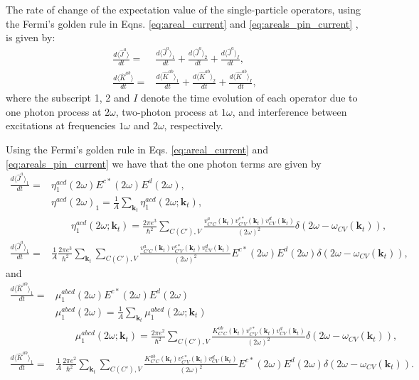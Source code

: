 \documentclass{article}
\begin{document}
The rate of change of the expectation value of the single-particle operators,
using the Fermi's golden rule in Eqns. \eqref{eq:areal_current} and \eqref{eq:areals_pin_current} , is given by:
\begin{align*}
    \frac{d\langle \hat{J}^{a}\rangle}{dt} = & \frac{d\langle \hat{J}^{a}\rangle_{1}}{dt} + 
    \frac{d\langle \hat{J}^{a}\rangle_{2}}{dt} + \frac{d\langle \hat{J}^{a}\rangle_{I}}{dt}, \\
    \frac{d\langle \hat{K}^{ab}\rangle}{dt} = & \frac{d\langle \hat{K}^{ab}\rangle_{1}}{dt} + 
    \frac{d\langle \hat{K}^{ab}\rangle_{2}}{dt} + \frac{d\langle \hat{K}^{ab}\rangle_{I}}{dt},
\end{align*}
where the subscript 1, 2 and $I$ denote the time evolution of each operator due to one photon process at $2\omega$, two-photon process at $1\omega$, and interference between excitations at frequencies $1\omega$ and $2\omega$, respectively.


Using the Fermi's golden rule in Eqs. \ref{eq:areal_current} and \ref{eq:areals_pin_current} we have that the one photon terms are given by
\begin{align*}
    \frac{d \langle \hat{J}^{a} \rangle_{1}}{dt} = & \eta_{1}^{acd}(2\omega) E^{c*}(2\omega) E^{d}(2\omega), \\
    & \eta^{acd}(2\omega)_{1} = \frac{1}{A} \sum_{\mathbf{k}_{t}} \eta_{1}^{acd}(2\omega;\mathbf{k}_{t}), \\
    & \qquad \eta_{1}^{acd}(2\omega;\mathbf{k}_{t}) = \frac{2\pi e^{3}}{\hbar^{2}} \sum_{C(C'),V}
    \frac{v^{a}_{C'C}(\mathbf{k}_{t})v^{c*}_{C'V}(\mathbf{k}_{t})v^{d}_{CV}(\mathbf{k}_{t})}{(2\omega)^{2}}
    \delta(2\omega-\omega_{CV}(\mathbf{k}_{t})), \\
    \frac{d \langle \hat{J}^{a} \rangle_{1}}{dt} = & \frac{1}{A}\frac{2\pi e^{3}}{\hbar^{2}} \sum_{\mathbf{k}_{t}} 
    \sum_{C(C'),V} \frac{v^{a}_{C'C}(\mathbf{k}_{t})v^{c*}_{C'V}(\mathbf{k}_{t})v^{d}_{CV}(\mathbf{k}_{t})}{(2\omega)^{2}}
    E^{c*}(2\omega) E^{d}(2\omega) \delta(2\omega-\omega_{CV}(\mathbf{k}_{t})),
\end{align*}
and
\begin{align*}
    \frac{d \langle \hat{K}^{ab}\rangle_{1}}{dt} = & \mu^{abcd}_{1}(2\omega)E^{c*}(2\omega)E^{d}(2\omega)\\
    & \mu^{abcd}_{1}(2\omega) = \frac{1}{A} \sum _{\mathbf{k}_{t}} \mu^{abcd}_{1}(2\omega;\mathbf{k}_{t}) \\
    & \qquad \mu^{abcd}_{1}(2\omega;\mathbf{k}_{t}) = \frac{2\pi e^{2}}{\hbar^{2}} \sum_{C(C'),V} \frac{K^{ab}_{C'C}(\mathbf{k}_{t}) v ^{c*}_{C'V}(\mathbf{k}_{t}) v^{d}_{CV}(\mathbf{k}_{t})}{(2\omega)^{2}} \delta(2\omega-\omega_{CV}(\mathbf{k}_{t})), \\
    \frac{d \langle \hat{K}^{ab}\rangle_{1}}{dt} = & \frac{1}{A} \frac{2\pi e^{2}}{\hbar^{2}} \sum _{\mathbf{k}_{t}}  \sum_{C(C'),V} \frac{K^{ab}_{C'C}(\mathbf{k}_{t}) v ^{c*}_{C'V}(\mathbf{k}_{t}) v^{d}_{CV}(\mathbf{k}_{t})}{(2\omega)^{2}} E^{c*}(2\omega)E^{d}(2\omega) \delta(2\omega-\omega_{CV}(\mathbf{k}_{t})) .
\end{align*}
\end{document}
